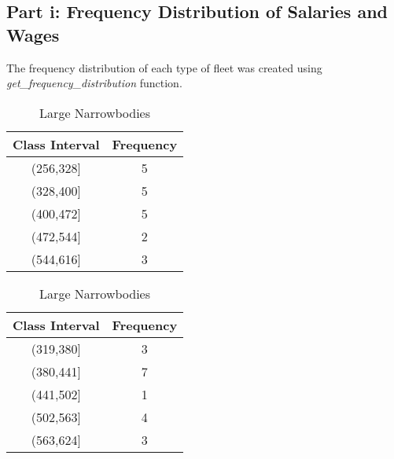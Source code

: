 \subsection{Part i: Frequency Distribution of Salaries and Wages}

The frequency distribution of each type of fleet was created using
\textit{get\_frequency\_distribution} function.


\begin{table}[H]
    \centering
    \caption{Frequency Distribution of Salaries and Wages}

    \begin{minipage}{0.45\textwidth}
        \centering
        \caption*{Small Narrowbodies}
        \begin{tabular}{|c|c|}
            \hline
            Class Interval & Frequency \\
            \hline
            (256,328]      & 5         \\
            (328,400]      & 5         \\
            (400,472]      & 5         \\
            (472,544]      & 2         \\
            (544,616]      & 3         \\
            \hline
        \end{tabular}
    \end{minipage}%
    \hspace{0.05\textwidth} %
    \begin{minipage}{0.45\textwidth}
        \centering
        \caption*{Large Narrowbodies}
        \begin{tabular}{|c|c|}
            \hline
            Class Interval & Frequency \\
            \hline
            (319,380]      & 3         \\
            (380,441]      & 7         \\
            (441,502]      & 1         \\
            (502,563]      & 4         \\
            (563,624]      & 3         \\
            \hline
        \end{tabular}
    \end{minipage}
\end{table}

